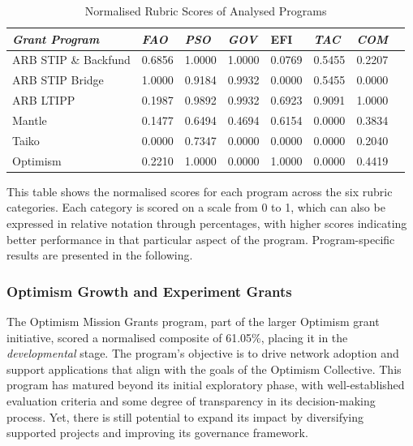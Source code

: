 \documentclass[conference]{IEEEtran}
\begin{document}
\begin{table}[htbp]
\caption{Normalised Rubric Scores of Analysed Programs}
\begin{center}
\footnotesize
\begin{tabular}{p{2.9cm}p{0.5cm}p{0.5cm}p{0.5cm}p{0.5cm}p{0.5cm}p{0.5cm}p{0.5cm}}
\hline
\textbf{\textit{Grant Program}} & \textbf{\textit{FAO}} & \textbf{\textit{PSO}} & \textbf{\textit{GOV}} & \textbf{EFI} & \textbf{\textit{TAC}} & \textbf{\textit{COM}} \\
\hline
ARB STIP \& Backfund & 0.6856 & 1.0000 & 1.0000 & 0.0769 & 0.5455 & 0.2207 \\
ARB STIP Bridge & 1.0000 & 0.9184 & 0.9932 & 0.0000 & 0.5455 & 0.0000 \\
ARB LTIPP & 0.1987 & 0.9892 & 0.9932 & 0.6923 & 0.9091 & 1.0000 \\
Mantle & 0.1477 & 0.6494 & 0.4694 & 0.6154 & 0.0000 & 0.3834 \\
Taiko & 0.0000 & 0.7347 & 0.0000 & 0.0000 & 0.0000 & 0.2040 \\
Optimism & 0.2210 & 1.0000 & 0.0000 & 1.0000 & 0.0000 & 0.4419 \\
\hline
\end{tabular}
\end{center}
\label{tab:rubric_scores}
\end{table}

This table shows the normalised scores for each program across the six rubric categories. Each category is scored on a scale from 0 to 1, which can also be expressed in relative notation through percentages, with higher scores indicating better performance in that particular aspect of the program. Program-specific results are presented in the following.

\subsubsection{Optimism Growth and Experiment Grants}\label{sec_4.2.1}
The Optimism Mission Grants program, part of the larger Optimism grant initiative, scored a normalised composite of 61.05\%, placing it in the \textit{developmental} stage. The program’s objective is to drive network adoption and support applications that align with the goals of the Optimism Collective. This program has matured beyond its initial exploratory phase, with well-established evaluation criteria and some degree of transparency in its decision-making process. Yet, there is still potential to expand its impact by diversifying supported projects and improving its governance framework.
\end{document}
